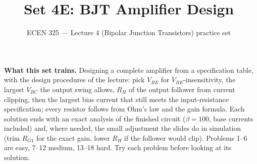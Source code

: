 \documentclass[11pt]{article}
\title{Set 4E: BJT Amplifier Design}
\author{ECEN 325 --- Lecture 4 (Bipolar Junction Transistors) practice set}
\date{}
\begin{document}
\maketitle

\textbf{What this set trains.} Designing a complete amplifier from a specification table, with the design procedures
of the lecture: pick $V_{RE}$ for $V_{BE}$-insensitivity, the largest $V_{RC}$ the output swing allows, $R_H$ of the
output follower from current clipping, then the largest bias current that still meets the input-resistance
specification; every resistor follows from Ohm's law and the gain formula. Each solution ends with an exact analysis
of the finished circuit ($\beta = 100$, base currents included) and, where needed, the small adjustment the slides
do in simulation (trim $R_{G1}$ for the exact gain, lower $R_H$ if the follower would clip). Problems 1--6 are easy,
7--12 medium, 13--18 hard. Try each problem before looking at its solution.
\end{document}
